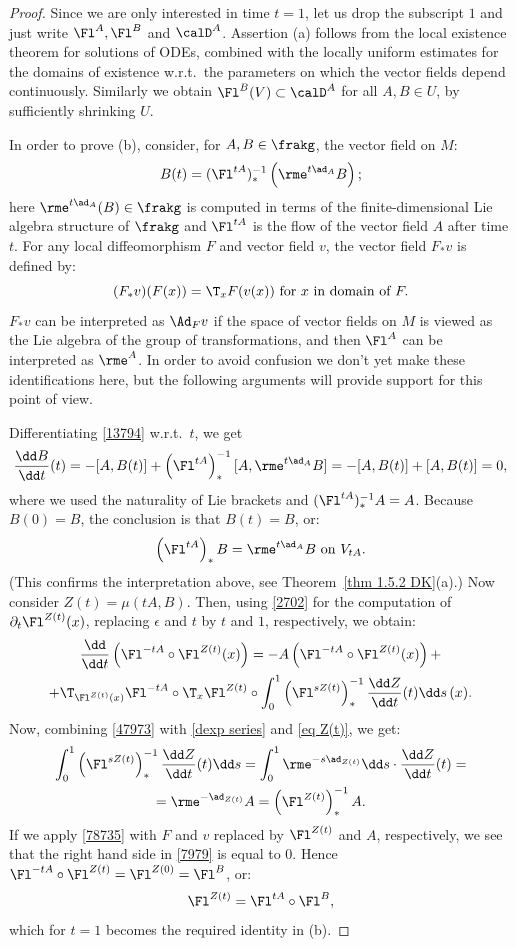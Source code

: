 \begin{proof}
    Since we are only interested in time $t=1$, let us drop the subscript $1$ and just write $\Fl^A,\Fl^B$ and $\calD^A$. Assertion (a) follows from the local existence theorem for solutions of ODEs, combined with the locally uniform estimates for the domains of existence w.r.t.\ the parameters on which the vector fields depend continuously. Similarly we obtain $\Fl^B(V)\subset \calD^A$ for all $A,B\in U$, by sufficiently shrinking $U$.

    In order to prove (b), consider, for $A,B\in\frakg$, the vector field on $M$:
    \[B(t)=(\Fl^{tA})_\ast^{-1}\left(\rme^{t\ad_A}B\right);\label{13794}\]
    here $\rme^{t\ad_A}(B)\in\frakg$ is computed in terms of the finite-dimensional Lie algebra structure of $\frakg$ and $\Fl^{tA}$ is the flow of the vector field $A$ after time $t$. For any local diffeomorphism $F$ and vector field $v$, the vector field $F_\ast v$ is defined by:
    \[(F_\ast v)(F(x))=\T_xF(v(x))\text{ for }x\text{ in domain of }F.\label{78735}\]
    $F_\ast v$ can be interpreted as $\Ad_F v$ if the space of vector fields on $M$ is viewed as the Lie algebra of the group of transformations, and then $\Fl^A$ can be interpreted as $\rme^A$. In order to avoid confusion we don't yet make these identifications here, but the following arguments will provide support for this point of view.

    Differentiating \eqref{13794} w.r.t.\ $t$, we get
    \[\frac{\dd B}{\dd t}(t)=-[A,B(t)]+\left(\Fl^{tA}\right)_\ast^{-1}[A,\rme^{t\ad_A}B]=-[A,B(t)]+[A,B(t)]=0,\]
    where we used the naturality of Lie brackets and $(\Fl^{tA})_\ast^{-1}A=A$. Because $B(0)=B$, the conclusion is that $B(t)=B$, or:
    \[\left(\Fl^{tA}\right)_\ast B=\rme^{t\ad_A}B\text{ on }V_{tA}.\label{47973}\]
    (This confirms the interpretation above, see Theorem~\ref{thm 1.5.2 DK}(a).) Now consider $Z(t)=\mu(tA,B)$. Then, using \eqref{2702} for the computation of $\partial_t \Fl^{Z(t)}(x)$, replacing $\epsilon$ and $t$ by $t$ and $1$, respectively, we obtain:
    \begin{multline}
        \frac{\dd}{\dd t}\left(\Fl^{-tA}\circ \Fl^{Z(t)}(x)\right)=-A\left(\Fl^{-tA}\circ \Fl^{Z(t)}(x)\right)+\\
        +\T_{\Fl^{Z(t)}(x)}\Fl^{-tA}\circ \T_x\Fl^{Z(t)}\circ\int_0^1 \left(\Fl^{sZ(t)}\right)_\ast^{-1}\frac{\dd Z}{\dd t}(t)\dd s\,(x).\label{7979}
    \end{multline}
    Now, combining \eqref{47973} with \eqref{dexp series} and \eqref{eq Z(t)}, we get:
    \begin{multline}
        \int_0^1\left(\Fl^{sZ(t)}\right)_\ast^{-1}\frac{\dd Z}{\dd t}(t)\dd s
        =\int_0^1 \rme^{-s\ad_{Z(t)}}\dd s \cdot \frac{\dd Z}{\dd t}(t)=\\
        =\rme^{-\ad_{Z(t)}}A=\left(\Fl^{Z(t)}\right)_\ast^{-1} A.
    \end{multline}
    If we apply \eqref{78735} with $F$ and $v$ replaced by $\Fl^{Z(t)}$ and $A$, respectively, we see that the right hand side in \eqref{7979} is equal to $0$. Hence $\Fl^{-tA}\circ \Fl^{Z(t)}=\Fl^{Z(0)}=\Fl^B$, or:
    \[\Fl^{Z(t)}=\Fl^{tA}\circ \Fl^B,\]
    which for $t=1$ becomes the required identity in (b).


\end{proof}
